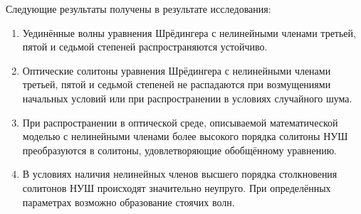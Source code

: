 \documentclass[12pt,a4paper]{article}
\begin{document}
	Следующие результаты получены в результате исследования:
	\begin{enumerate}
	\setlength\itemsep{1em}
		\item Уединённые волны уравнения Шрёдингера с нелинейными членами третьей, пятой и седьмой степеней распространяются устойчиво.
		\item Оптические солитоны уравнения Шрёдингера с нелинейными членами третьей, пятой и седьмой степеней не распадаются при возмущениями начальных условий или при распространении в условиях случайного шума.
		\item При распространении в оптической среде, описываемой математической моделью с нелинейными членами более высокого порядка солитоны НУШ преобразуются в солитоны, удовлетворяющие обобщённому уравнению. 
		\item В условиях наличия нелинейных членов высшего порядка столкновения солитонов НУШ происходят значительно неупруго. При определённых параметрах возможно образование стоячих волн.
	\end{enumerate}
\renewcommand\refname{Список литературы}
\end{document}
